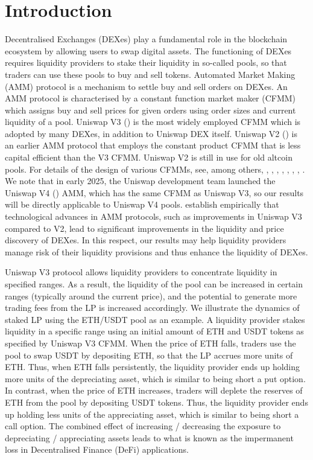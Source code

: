 \documentclass[pdftex,11pt,a4paper] {article}
\begin{document}
\section{Introduction}

Decentralised Exchanges (DEXes) play a fundamental role in the blockchain
ecosystem by allowing users to swap digital assets. The functioning of DEXes
requires liquidity providers to stake their liquidity in so-called pools,
so that traders can use these pools to buy and sell tokens. Automated
Market Making (AMM) protocol is a mechanism to settle buy and sell orders
on DEXes. An AMM protocol is characterised by a constant function market
maker (CFMM) which assigns buy and sell prices for given orders using order
sizes and current liquidity of a pool. Uniswap V3 (\citet{V3}) is the most
widely employed CFMM which is adopted by many DEXes, in addition to Uniswap
DEX itself. Uniswap V2 (\citet{V2}) is an earlier AMM protocol that employs the constant product CFMM
that is less capital efficient than the V3 CFMM. Uniswap V2 is still in use for
old altcoin pools. For details of the design of various CFMMs, see, among others, \citet{Angeris2019}, \citet{LiptonTreccani2021}, \citet{Mohan2022}, %
\citet{LiptonHardjono2022}, \citet{LiptonSepp2022}, \citet{Milionis2022}, %
\citet{Park2023}, \citet{Lehar2024}. We note that in early 2025, the Uniswap development team launched the Uniswap V4 (\citet{V4}) AMM, which has the same CFMM as Uniswap V3, so our results will be directly applicable to Uniswap V4 pools. \citet{Alexander2024} establish empirically that technological advances in AMM protocols, such as improvements in Uniswap V3 compared to V2, lead to significant improvements in the liquidity and price discovery of DEXes. In this respect, our results may help liquidity providers manage risk of their liquidity provisions and thus enhance the liquidity of DEXes.


Uniswap V3 protocol allows liquidity providers to concentrate liquidity in
specified ranges. As a result, the liquidity of the pool can be increased in
certain ranges (typically around the current price), and the potential to
generate more trading fees from the LP is increased accordingly. We
illustrate the dynamics of staked LP using the ETH/USDT pool as an example. A
liquidity provider stakes liquidity in a specific range using an initial amount
of ETH and USDT tokens as specified by Uniswap V3 CFMM. When the price of
ETH falls, traders use the pool to swap USDT by depositing ETH, so that the
LP accrues more units of ETH. Thus, when ETH falls persistently, the
liquidity provider ends up holding more units of the depreciating asset,
which is similar to being short a put option. In contrast, when the price of ETH
increases, traders will deplete the reserves of ETH from the pool by depositing
USDT tokens. Thus, the liquidity provider ends up holding less units of the
appreciating asset, which is similar to being short a call option. The
combined effect of increasing / decreasing the exposure to depreciating /
appreciating assets leads to what is known as the impermanent loss in
Decentralised Finance (DeFi) applications.
\end{document}
